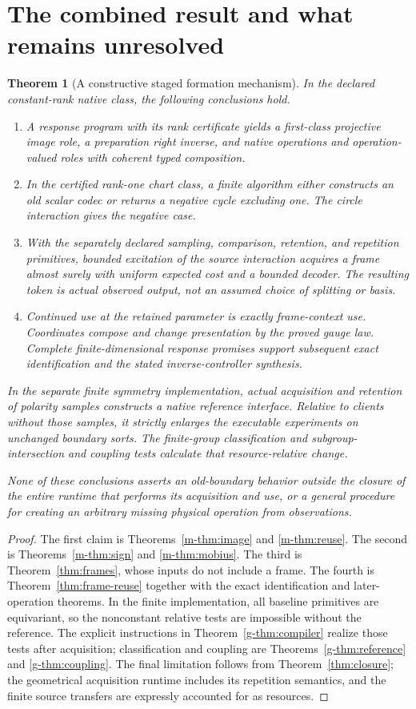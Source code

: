 \documentclass[11pt]{article}
\newtheorem{theorem}{Theorem}[section]
\theoremstyle{definition}
\theoremstyle{remark}
\begin{document}
\section{The combined result and what remains unresolved}
\begin{theorem}[A constructive staged formation mechanism]\label{thm:combined}
In the declared constant-rank native class, the following conclusions hold.
\begin{enumerate}
\item A response program with its rank certificate yields a first-class projective image role, a preparation right inverse, and native operations and operation-valued roles with coherent typed composition.
\item In the certified rank-one chart class, a finite algorithm either constructs an old scalar codec or returns a negative cycle excluding one. The circle interaction gives the negative case.
\item With the separately declared sampling, comparison, retention, and repetition primitives, bounded excitation of the source interaction acquires a frame almost surely with uniform expected cost and a bounded decoder. The resulting token is actual observed output, not an assumed choice of splitting or basis.
\item Continued use at the retained parameter is exactly frame-context use. Coordinates compose and change presentation by the proved gauge law. Complete finite-dimensional response promises support subsequent exact identification and the stated inverse-controller synthesis.
\end{enumerate}
In the separate finite symmetry implementation, actual acquisition and retention of polarity samples constructs a native reference interface. Relative to clients without those samples, it strictly enlarges the executable experiments on unchanged boundary sorts. The finite-group classification and subgroup-intersection and coupling tests calculate that resource-relative change.

None of these conclusions asserts an old-boundary behavior outside the closure of the entire runtime that performs its acquisition and use, or a general procedure for creating an arbitrary missing physical operation from observations.
\end{theorem}
\begin{proof}
The first claim is Theorems~\ref{m-thm:image} and \ref{m-thm:reuse}. The second is Theorems~\ref{m-thm:sign} and \ref{m-thm:mobius}. The third is Theorem~\ref{thm:frames}, whose inputs do not include a frame. The fourth is Theorem~\ref{thm:frame-reuse} together with the exact identification and later-operation theorems. In the finite implementation, all baseline primitives are equivariant, so the nonconstant relative tests are impossible without the reference. The explicit instructions in Theorem~\ref{g-thm:compiler} realize those tests after acquisition; classification and coupling are Theorems~\ref{g-thm:reference} and \ref{g-thm:coupling}. The final limitation follows from Theorem~\ref{thm:closure}; the geometrical acquisition runtime includes its repetition semantics, and the finite source transfers are expressly accounted for as resources.
\end{proof}
\end{document}
